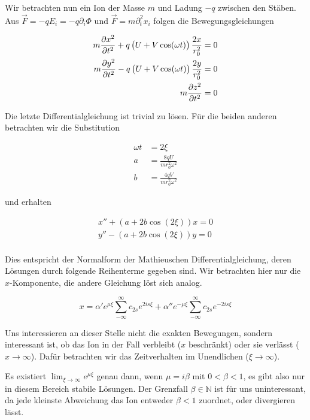 \documentclass[a4paper,german,12pt,smallheadings]{scrartcl}
\begin{document}
Wir betrachten nun ein Ion der Masse $m$ und Ladung $-q$ zwischen den Stäben.
Aus $\vec{F} = -q E_i = -q \partial_i \Phi$ und $\vec{F} = m \partial_t^2 x_i$
folgen die Bewegungsgleichungen

\begin{align}
  m \frac{\partial x^2}{\partial t^2} + q \del{U + V \cos(\omega t)} \frac{2 x}{r_0^2} &= 0 \\
  m \frac{\partial y^2}{\partial t^2} - q \del{U + V \cos(\omega t)} \frac{2 y}{r_0^2} &= 0 \\
  m \frac{\partial z^2}{\partial t^2} &= 0
\end{align}

Die letzte Differentialgleichung ist trivial zu lösen. Für die beiden anderen
betrachten wir die Substitution

\begin{align}
  \omega t &= 2 \xi \\
  a &= \frac{8qU}{m r_0^2 \omega^2} \\
  b &= \frac{4qV}{m r_0^2 \omega^2}
\end{align}

und erhalten

\begin{align}
  x'' + (a + 2 b \cos(2 \xi)) x = 0 \\
  y'' - (a + 2 b \cos(2 \xi)) y = 0 \\
\end{align}

Dies entspricht der Normalform der Mathieuschen Differentialgleichung, deren
Lösungen durch folgende Reihenterme gegeben sind. Wir betrachten hier nur die
$x$-Komponente, die andere Gleichung löst sich analog.

\begin{equation}
  x = \alpha' e^{\mu \xi} \sum_{-\infty}^{\infty} c_{2s} e^{2is \xi} + \alpha'' e^{-\mu \xi} \sum_{-\infty}^{\infty} c_{2s} e^{-2is \xi}
\end{equation}

Uns interessieren an dieser Stelle nicht die exakten Bewegungen, sondern
interessant ist, ob das Ion in der Fall verbleibt ($x$ beschränkt) oder sie
verlässt ($x \to \infty$). Dafür betrachten wir das Zeitverhalten im
Unendlichen ($\xi \to \infty$).

Es existiert $\lim_{\xi \to \infty} e^{\mu \xi}$ genau dann, wenn $\mu = i
\beta$ mit $0 < \beta < 1$, es gibt also nur in diesem Bereich stabile
Lösungen. Der Grenzfall $\beta \in \mathbb{N}$ ist für uns uninteressant, da
jede kleinste Abweichung das Ion entweder $\beta < 1$ zuordnet, oder
divergieren lässt.
\end{document}
